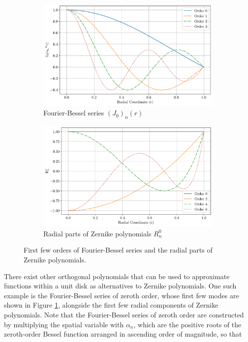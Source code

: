 \begin{figure}
    \centering
    \begin{subfigure}[b]{0.48\textwidth}
        \centering
        \includegraphics[width=\textwidth]{figs/bessel_exp.pdf}
        \caption{Fourier-Bessel series $(J_0)_n(r)$}
    \end{subfigure}
    \hspace{1em}
    \begin{subfigure}[b]{0.48\textwidth}
        \centering
        \includegraphics[width=\textwidth]{figs/zernike_exp.pdf}
        \caption{Radial parts of Zernike polynomials $R^0_n$}
    \end{subfigure}
    \caption{First few orders of Fourier-Bessel series and the radial parts of Zernike polynomials.}
    \label{fig_x}
\end{figure}

There exist other orthogonal polynomials that can be used to approximate functions within a unit disk as alternatives to Zernike polynomials. One such example is the Fourier-Bessel series of zeroth order, whose first few modes are shown in Figure \ref{fig_x}, alongside the first few radial components of Zernike polynomials. Note that the Fourier-Bessel series of zeroth order are constructed by multiplying the spatial variable with $\alpha_n$, which are the positive roots of the zeroth-order Bessel function arranged in ascending order of mag­nitude, so that

